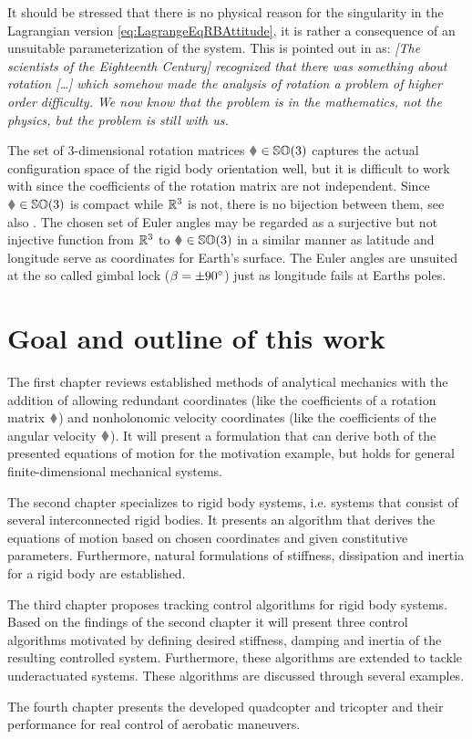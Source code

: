 It should be stressed that there is no physical reason for the singularity in the Lagrangian version \eqref{eq:LagrangeEqRBAttitude}, it is rather a consequence of an unsuitable parameterization of the system.
This is pointed out in \cite[sec.\ 1.1.1]{Schwertassek:MultibodySystems} as:
\textit{
[The scientists of the Eighteenth Century] recognized that there was something about rotation [\ldots] which somehow made the analysis of rotation a problem of higher order difficulty. 
We now know that the problem is in the mathematics, not the physics, but the problem is still with us.
}

The set of 3-dimensional rotation matrices $\R\in\SpecialOrthogonalGroup(3)$ captures the actual configuration space of the rigid body orientation well, but it is difficult to work with since the coefficients of the rotation matrix are not independent.
Since $\R\in\SpecialOrthogonalGroup(3)$ is compact while $\mathbb{R}^3$ is not, there is no bijection between them, see also \cite[sec.\ 1.1d]{Frankel:GeometryOfPhysics}.
The chosen set of Euler angles may be regarded as a surjective but not injective function from $\mathbb{R}^3$ to $\R\in\SpecialOrthogonalGroup(3)$ in a similar manner as latitude and longitude serve as coordinates for Earth's surface. 
The Euler angles are unsuited at the so called gimbal lock ($\beta=\pm 90^\circ$) just as longitude fails at Earths poles.


\section{Goal and outline of this work}
The first chapter reviews established methods of analytical mechanics with the addition of allowing redundant coordinates (like the coefficients of a rotation matrix $\R$) and nonholonomic velocity coordinates (like the coefficients of the angular velocity $\w$).
It will present a formulation that can derive both of the presented equations of motion for the motivation example, but holds for general finite-dimensional mechanical systems.

The second chapter specializes to rigid body systems, i.e. systems that consist of several interconnected rigid bodies.
It presents an algorithm that derives the equations of motion based on chosen coordinates and given constitutive parameters.
Furthermore, natural formulations of stiffness, dissipation and inertia for a rigid body are established.

The third chapter proposes tracking control algorithms for rigid body systems.
Based on the findings of the second chapter it will present three control algorithms motivated by defining desired stiffness, damping and inertia of the resulting controlled system.
Furthermore, these algorithms are extended to tackle underactuated systems.
These algorithms are discussed through several examples.

The fourth chapter presents the developed quadcopter and tricopter and their performance for real control of aerobatic maneuvers.

